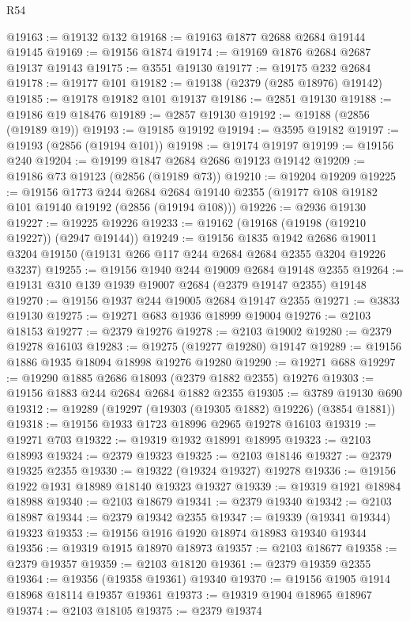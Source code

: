 \begin{lexlean}{R54}
\begin{coremodule}
@19163 := @19132 @132
@19168 := @19163 @1877 @2688 @2684 @19144 @19145
@19169 := @19156 @1874
@19174 := @19169 @1876 @2684 @2687 @19137 @19143
@19175 := @3551 @19130
@19177 := @19175 @232 @2684
@19178 := @19177 @101
@19182 := @19138 (@2379 (@285 @18976) @19142)
@19185 := @19178 @19182 @101 @19137
@19186 := @2851 @19130
@19188 := @19186 @19 @18476
@19189 := @2857 @19130
@19192 := @19188 (@2856 (@19189 @19))
@19193 := @19185 @19192
@19194 := @3595 @19182
@19197 := @19193 (@2856 (@19194 @101))
@19198 := @19174 @19197
@19199 := @19156 @240
@19204 := @19199 @1847 @2684 @2686 @19123 @19142
@19209 := @19186 @73 @19123 (@2856 (@19189 @73))
@19210 := @19204 @19209
@19225 := @19156
    @1773
    @244
    @2684
    @2684
    @19140
    @2355
    (@19177 @108 @19182 @101 @19140 @19192 (@2856 (@19194 @108)))
@19226 := @2936 @19130
@19227 := @19225 @19226
@19233 := @19162 (@19168 (@19198 (@19210 @19227)) (@2947 @19144))
@19249 := @19156
    @1835
    @1942
    @2686
    @19011
    @3204
    @19150
    (@19131 @266 @117 @244 @2684 @2684 @2355 @3204 @19226 @3237)
@19255 := @19156 @1940 @244 @19009 @2684 @19148 @2355
@19264 := @19131 @310 @139 @1939 @19007 @2684 (@2379 @19147 @2355) @19148
@19270 := @19156 @1937 @244 @19005 @2684 @19147 @2355
@19271 := @3833 @19130
@19275 := @19271 @683 @1936 @18999 @19004
@19276 := @2103 @18153
@19277 := @2379 @19276
@19278 := @2103 @19002
@19280 := @2379 @19278 @16103
@19283 := @19275 (@19277 @19280) @19147
@19289 := @19156 @1886 @1935 @18094 @18998 @19276 @19280
@19290 := @19271 @688
@19297 := @19290 @1885 @2686 @18093 (@2379 @1882 @2355) @19276
@19303 := @19156 @1883 @244 @2684 @2684 @1882 @2355
@19305 := @3789 @19130 @690
@19312 := @19289 (@19297 (@19303 (@19305 @1882) @19226) (@3854 @1881))
@19318 := @19156 @1933 @1723 @18996 @2965 @19278 @16103
@19319 := @19271 @703
@19322 := @19319 @1932 @18991 @18995
@19323 := @2103 @18993
@19324 := @2379 @19323
@19325 := @2103 @18146
@19327 := @2379 @19325 @2355
@19330 := @19322 (@19324 @19327) @19278
@19336 := @19156 @1922 @1931 @18989 @18140 @19323 @19327
@19339 := @19319 @1921 @18984 @18988
@19340 := @2103 @18679
@19341 := @2379 @19340
@19342 := @2103 @18987
@19344 := @2379 @19342 @2355
@19347 := @19339 (@19341 @19344) @19323
@19353 := @19156 @1916 @1920 @18974 @18983 @19340 @19344
@19356 := @19319 @1915 @18970 @18973
@19357 := @2103 @18677
@19358 := @2379 @19357
@19359 := @2103 @18120
@19361 := @2379 @19359 @2355
@19364 := @19356 (@19358 @19361) @19340
@19370 := @19156 @1905 @1914 @18968 @18114 @19357 @19361
@19373 := @19319 @1904 @18965 @18967
@19374 := @2103 @18105
@19375 := @2379 @19374

\end{coremodule}
\end{lexlean}
